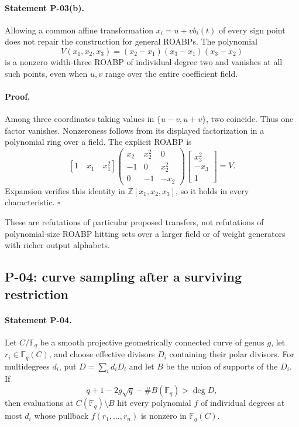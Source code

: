 \documentclass[11pt,a4paper]{article}
\theoremstyle{definition}\newtheorem{definition}{Definition}
\begin{document}
\paragraph{Statement P-03(b).}
Allowing a common affine transformation $x_i=u+vb_i(t)$ of every sign point does not repair the construction for general ROABPs. The polynomial
\[
 V(x_1,x_2,x_3)=(x_2-x_1)(x_3-x_1)(x_3-x_2)
\]
is a nonzero width-three ROABP of individual degree two and vanishes at all such points, even when $u,v$ range over the entire coefficient field.
\paragraph{Proof.}
Among three coordinates taking values in $\{u-v,u+v\}$, two coincide. Thus one factor vanishes. Nonzeroness follows from its displayed factorization in a polynomial ring over a field. The explicit ROABP is
\[
 [1\quad x_1\quad x_1^2]
 \begin{pmatrix}
 x_2&x_2^2&0\\-1&0&x_2^2\\0&-1&-x_2
 \end{pmatrix}
 \begin{bmatrix}x_3^2\\-x_3\\1\end{bmatrix}=V.
\]
Expansion verifies this identity in $\mathbb Z[x_1,x_2,x_3]$, so it holds in every characteristic. $\square$

These are refutations of particular proposed transfers, not refutations of polynomial-size ROABP hitting sets over a larger field or of weight generators with richer output alphabets.

\subsection{P-04: curve sampling after a surviving restriction}
\paragraph{Statement P-04.}
Let $C/\mathbb F_q$ be a smooth projective geometrically connected curve of genus $g$, let $r_i\in\mathbb F_q(C)$, and choose effective divisors $D_i$ containing their polar divisors. For multidegrees $d_i$, put $D=\sum_i d_iD_i$ and let $B$ be the union of supports of the $D_i$. If
\[
 q+1-2g\sqrt q-\#B(\mathbb F_q)>\deg D,
\]
then evaluations at $C(\mathbb F_q)\setminus B$ hit every polynomial $f$ of individual degrees at most $d_i$ whose pullback $f(r_1,\ldots,r_n)$ is nonzero in $\mathbb F_q(C)$.
\end{document}
